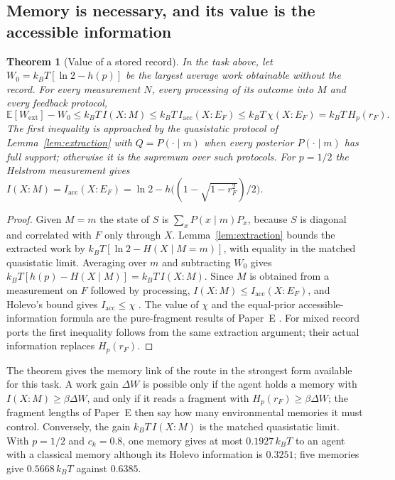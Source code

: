 \documentclass[12pt]{article}
\newtheorem{theorem}{Theorem}
\begin{document}
\subsection{Memory is necessary, and its value is the accessible information}

\begin{theorem}[Value of a stored record]
\label{thm:value}
In the task above, let $W_0=k_BT[\ln2-h(p)]$ be the largest average work obtainable without the record. For every measurement $N$, every processing of its outcome into $M$ and every feedback protocol,
\[
\mathbb E[W_{\mathrm{ext}}]-W_0\le k_BT\,I(X{:}M)\le k_BT\,I_{\mathrm{acc}}(X{:}E_F)\le k_BT\,\chi(X{:}E_F)=k_BT\,H_p(r_F).
\]
The first inequality is approached by the quasistatic protocol of Lemma~\ref{lem:extraction} with $Q=P(\cdot\mid m)$ when every posterior $P(\cdot\mid m)$ has full support; otherwise it is the supremum over such protocols. For $p=1/2$ the Helstrom measurement gives $I(X{:}M)=I_{\mathrm{acc}}(X{:}E_F)=\ln2-h\bigl((1-\sqrt{1-r_F^2})/2\bigr)$.
\end{theorem}

\begin{proof}
Given $M=m$ the state of $S$ is $\sum_xP(x\mid m)P_x$, because $S$ is diagonal and correlated with $F$ only through $X$. Lemma~\ref{lem:extraction} bounds the extracted work by $k_BT[\ln2-H(X\mid M=m)]$, with equality in the matched quasistatic limit. Averaging over $m$ and subtracting $W_0$ gives $k_BT[h(p)-H(X\mid M)]=k_BT\,I(X{:}M)$. Since $M$ is obtained from a measurement on $F$ followed by processing, $I(X{:}M)\le I_{\mathrm{acc}}(X{:}E_F)$, and Holevo's bound gives $I_{\mathrm{acc}}\le\chi$ \cite{Holevo1973}. The value of $\chi$ and the equal-prior accessible-information formula are the pure-fragment results of Paper~E \cite{Liu2026HAFF_E}. For mixed record ports the first inequality follows from the same extraction argument; their actual information replaces $H_p(r_F)$.
\end{proof}

The theorem gives the memory link of the route in the strongest form available for this task. A work gain $\Delta W$ is possible only if the agent holds a memory with $I(X{:}M)\ge\beta\Delta W$, and only if it reads a fragment with $H_p(r_F)\ge\beta\Delta W$; the fragment lengths of Paper~E then say how many environmental memories it must control. Conversely, the gain $k_BT\,I(X{:}M)$ is the matched quasistatic limit. With $p=1/2$ and $c_k=0.8$, one memory gives at most $0.1927\,k_BT$ to an agent with a classical memory although its Holevo information is $0.3251$; five memories give $0.5668\,k_BT$ against $0.6385$.
\end{document}
